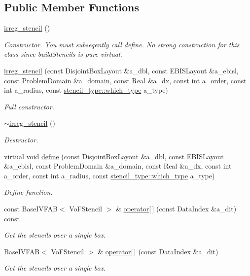 \subsection*{Public Member Functions}
\begin{DoxyCompactItemize}
\item 
\hyperlink{classirreg__stencil_a58f7afedd138659563d69dd6b671ddb8}{irreg\+\_\+stencil} ()
\begin{DoxyCompactList}\small\item\em Constructor. You must subseqently call define. No strong construction for this class since build\+Stencils is pure virtual. \end{DoxyCompactList}\item 
\hyperlink{classirreg__stencil_a03e38ee14739abfda2e506037a175994}{irreg\+\_\+stencil} (const Disjoint\+Box\+Layout \&a\+\_\+dbl, const E\+B\+I\+S\+Layout \&a\+\_\+ebisl, const Problem\+Domain \&a\+\_\+domain, const Real \&a\+\_\+dx, const int a\+\_\+order, const int a\+\_\+radius, const \hyperlink{namespacestencil__type_a1ffed19935b7289b50e8dcc017ee99c8}{stencil\+\_\+type\+::which\+\_\+type} a\+\_\+type)
\begin{DoxyCompactList}\small\item\em Full constructor. \end{DoxyCompactList}\item 
\hyperlink{classirreg__stencil_a298cf0844e4ed1346cd2068b2cdab7ff}{$\sim$irreg\+\_\+stencil} ()
\begin{DoxyCompactList}\small\item\em Destructor. \end{DoxyCompactList}\item 
virtual void \hyperlink{classirreg__stencil_a5035aa663ae3c3d4dcb032455828f027}{define} (const Disjoint\+Box\+Layout \&a\+\_\+dbl, const E\+B\+I\+S\+Layout \&a\+\_\+ebisl, const Problem\+Domain \&a\+\_\+domain, const Real \&a\+\_\+dx, const int a\+\_\+order, const int a\+\_\+radius, const \hyperlink{namespacestencil__type_a1ffed19935b7289b50e8dcc017ee99c8}{stencil\+\_\+type\+::which\+\_\+type} a\+\_\+type)
\begin{DoxyCompactList}\small\item\em Define function. \end{DoxyCompactList}\item 
const Base\+I\+V\+F\+AB$<$ Vo\+F\+Stencil $>$ \& \hyperlink{classirreg__stencil_a6c9b9b3d7f19d4e96622eb8b556caed9}{operator\mbox{[}$\,$\mbox{]}} (const Data\+Index \&a\+\_\+dit) const 
\begin{DoxyCompactList}\small\item\em Get the stencils over a single box. \end{DoxyCompactList}\item 
Base\+I\+V\+F\+AB$<$ Vo\+F\+Stencil $>$ \& \hyperlink{classirreg__stencil_aa23265c89c232368aa2ee16a1ffd9ef4}{operator\mbox{[}$\,$\mbox{]}} (const Data\+Index \&a\+\_\+dit)
\begin{DoxyCompactList}\small\item\em Get the stencils over a single box. \end{DoxyCompactList}\end{DoxyCompactItemize}
